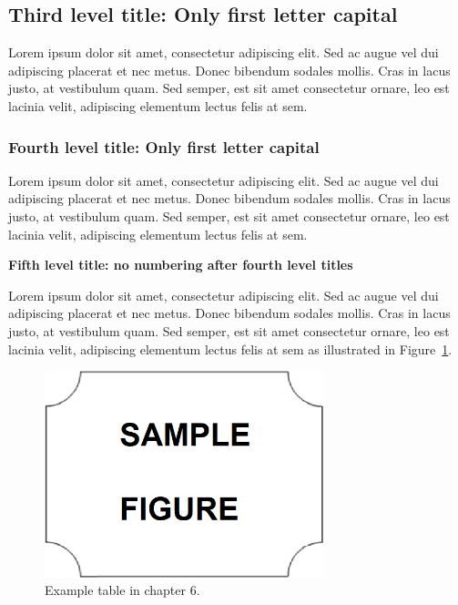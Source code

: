 \subsection{Third level title: Only first letter capital}

Lorem ipsum dolor sit amet, consectetur adipiscing elit. Sed ac augue vel dui 
adipiscing placerat et nec metus. Donec bibendum sodales mollis. Cras in lacus 
justo, at vestibulum quam. Sed semper, est sit amet consectetur ornare, leo est 
lacinia velit, adipiscing elementum lectus felis at sem.

\subsubsection{Fourth level title: Only first letter capital}

Lorem ipsum dolor sit amet, consectetur adipiscing elit. Sed ac augue vel dui 
adipiscing placerat et nec metus. Donec bibendum sodales mollis. Cras in lacus 
justo, at vestibulum quam. Sed semper, est sit amet consectetur ornare, leo est 
lacinia velit, adipiscing elementum lectus felis at sem.

{\bf Fifth level title: no numbering
after fourth level titles}

Lorem ipsum dolor sit amet, consectetur adipiscing elit. Sed ac augue vel dui 
adipiscing placerat et nec metus. Donec bibendum sodales mollis. Cras in lacus 
justo, at vestibulum quam. Sed semper, est sit amet consectetur ornare, leo est 
lacinia velit, adipiscing elementum lectus felis at sem as illustrated in Figure~\ref{fig:6-1}.

\begin{figure}[!ht]
 \centering
 \includegraphics[width=230pt,keepaspectratio=true]{./fig/sekil7}
 \vspace{4mm}
 \caption{Example table in chapter 6.}
 \label{fig:6-1}
\end{figure}

